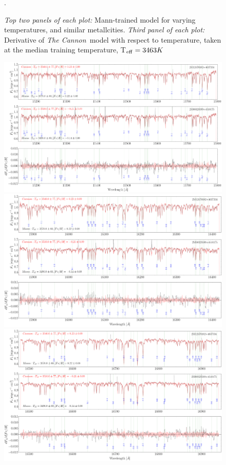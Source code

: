 \documentclass[modern]{aastex62}
\newcommand{\thecannon}{\textsl{The Cannon}}
\begin{document}
\begin{figure}[ht]
\begin{center}
\end{center}
\caption{\textit{Top two panels of each plot:} Mann-trained model for varying temperatures, and similar metallcities. \textit{Third panel of each plot:} Derivative of \thecannon\ model with respect to temperature, taken at the median training temperature, T$_{\rm eff}=3463 K$}. \label{fig:demo_teff}
\end{figure}

\begin{figure}[ht]
\begin{center}
\includegraphics[width=16cm]{figures/demo_derivatives_feh1.png}
\includegraphics[width=16cm]{figures/demo_derivatives_feh2.png}
\includegraphics[width=16cm]{figures/demo_derivatives_feh3.png}

\end{center}
\end{figure}
\end{document}
